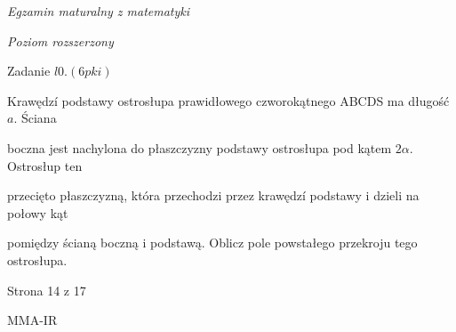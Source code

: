 \documentclass[a4paper,12pt]{article}
\begin{document}
{\it Egzamin maturalny z matematyki}

{\it Poziom rozszerzony}

Zadanie $l0. (6pki)$

Krawędzí podstawy ostrosłupa prawidłowego czworokątnego ABCDS ma długość $a$. Ściana

boczna jest nachylona do płaszczyzny podstawy ostrosłupa pod kątem $ 2\alpha$. Ostrosłup ten

przecięto płaszczyzną, która przechodzi przez krawędzí podstawy i dzieli na połowy kąt

pomiędzy ścianą boczną i podstawą. Oblicz pole powstałego przekroju tego ostrosłupa.

Strona 14 z 17

MMA-IR
\end{document}
